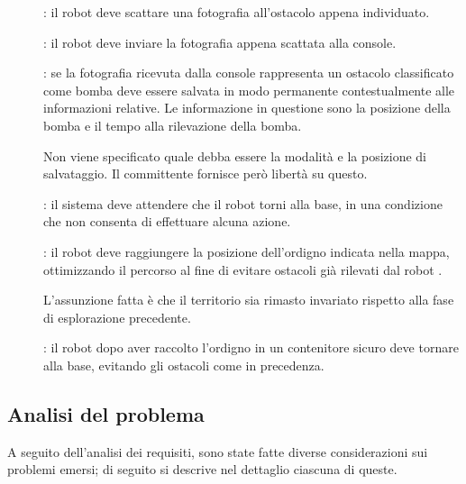 \begin{description}
  \item[]:
    il robot deve scattare una fotografia all'ostacolo appena individuato.

  \item[]:
    il robot deve inviare la fotografia appena scattata alla console.

  \item[]:
    se la fotografia ricevuta dalla console rappresenta un ostacolo classificato come bomba deve essere salvata
    in modo permanente contestualmente alle informazioni relative.
    Le informazione in questione sono la posizione della bomba e il tempo alla rilevazione della bomba.

    Non viene specificato quale debba essere la modalità e la posizione di salvataggio.
    Il committente fornisce però libertà su questo.

  \item[]:
    il sistema deve attendere che il robot  torni alla base, in una condizione che non consenta di effettuare alcuna azione.

  \item[]:
    il robot  deve raggiungere la posizione dell'ordigno indicata nella mappa,
    ottimizzando il percorso al fine di evitare ostacoli già rilevati dal robot .

    L'assunzione fatta è che il territorio sia rimasto invariato rispetto alla fase di esplorazione precedente.

  \item[]:
    il robot  dopo aver raccolto l’ordigno in un contenitore sicuro deve tornare alla base,
    evitando gli ostacoli come in precedenza.

\end{description}


\subsection{Analisi del problema}

A seguito dell'analisi dei requisiti, sono state fatte diverse considerazioni sui problemi emersi;
di seguito si descrive nel dettaglio ciascuna di queste.

